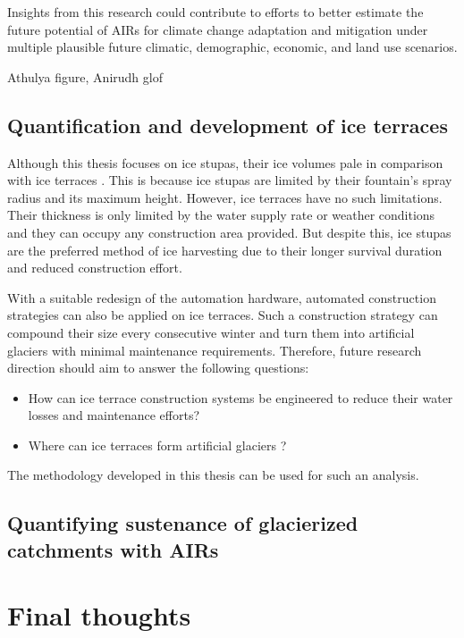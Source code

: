 Insights from this research could contribute to efforts to better estimate the future potential of AIRs for
climate change adaptation and mitigation under multiple plausible future climatic, demographic, economic, and
land use scenarios. 

Athulya figure, Anirudh glof

\subsection{Quantification and development of ice terraces}

Although this thesis focuses on ice stupas, their ice volumes pale in comparison with ice terraces
\citep{nusserSociohydrologyArtificialGlaciers2019}. This is because ice stupas are limited by their fountain's
spray radius and its maximum height. However, ice terraces have no such limitations. Their thickness is only
limited by the water supply rate or weather conditions and they can occupy any construction area provided. But
despite this, ice stupas are the preferred method of ice harvesting due to their longer survival duration and
reduced construction effort.

With a suitable redesign of the automation hardware, automated construction strategies can also be applied on
ice terraces. Such a construction strategy can compound their size every consecutive winter and turn them into
artificial glaciers with minimal maintenance requirements. Therefore, future research direction should aim to
answer the following questions:

\begin{itemize}

  \item How can ice terrace construction systems be engineered to reduce their water losses and maintenance
    efforts?
  \item Where can ice terraces form artificial glaciers ? 

\end{itemize}

The methodology developed in this thesis can be used for such an analysis.

\subsection{Quantifying sustenance of glacierized catchments with AIRs}

\section{Final thoughts}

